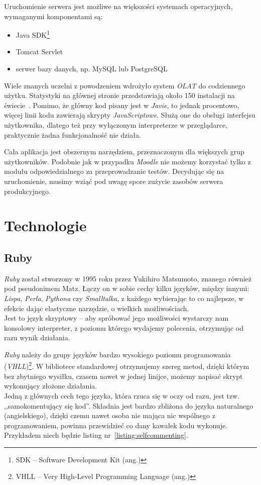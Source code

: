\documentclass[12pt,twoside]{report}
\begin{document}
Uruchomienie serwera jest możliwe na większości systemach operacyjnych, wymaganymi
komponentami są:

\begin{itemize}
  \item{Java SDK\footnote{SDK -- Software Development Kit (ang.)}}
  \item{Tomcat Servlet}
  \item{serwer bazy danych, np. MySQL lub PostgreSQL}
\end{itemize}


Wiele znanych uczelni z powodzeniem wdrożyło system \emph{OLAT} do codziennego użytku.
Statystyki na głównej stronie przedstawiają około 150 instalacji na świecie~\cite{olat}.
Pomimo, że główny kod pisany jest w \emph{Javie}, to jednak procentowo, więcej linii kodu
zawierają skrypty \emph{JavaScriptowe}. Służą one do obsługi interfejsu użytkownika,
dlatego też przy wyłączonym interpreterze w przeglądarce, praktycznie żadna funkcjonalność
nie działa.


Cała aplikacja jest obszernym narzędziem, przeznaczonym dla większych grup użytkowników.
Podobnie jak w przypadku \emph{Moodle} nie możemy korzystać tylko z modułu
odpowiedzialnego za przeprowadzanie testów. Decydując się na uruchomienie, musimy wziąć
pod uwagę spore zużycie zasobów serwera produkcyjnego.


\cleardoublepage
\chapter{Technologie}
\section{Ruby}
\emph{Ruby} został stworzony w 1995 roku przez Yukihiro Matsumoto, znanego również
pod pseudonimem Matz. Łączy on w sobie cechy kilku języków, między innymi: \emph{Lispa},
\emph{Perla}, \emph{Pythona} czy \emph{Smalltalka}, z każdego wybierając to co najlepsze,
w efekcie dając elastyczne narzędzie, o wielkich możliwościach.\\
Jest to język skryptowy -- aby spróbować jego możliwości wystarczy nam konsolowy
interpreter, z poziomu którego wydajemy polecenia, otrzymując od razu wynik działania.


\emph{Ruby} należy do grupy języków bardzo wysokiego poziomu programowania
(\emph{VHLL})\footnote{VHLL -- Very High-Level Programming Language (ang.)}.
W bibliotece standardowej otrzymujemy szereg metod, dzięki którym bez zbytniego wysiłku,
czasem nawet w jednej linijce, możemy napisać skrypt wykonujący złożone działania.\\
Jedną z głównych cech tego języka, która rzuca się w oczy od razu, jest tzw.
,,samokomentujący się kod''. Składnia jest bardzo zbliżona do języka naturalnego
(angielskiego), dzięki czemu nawet osoba nie mająca nic wspólnego z programowaniem,
powinna przewidzieć co dany kawałek kodu wykonuje. Przykładem niech będzie
listing nr~\ref{listing:selfcommenting}.
\end{document}
